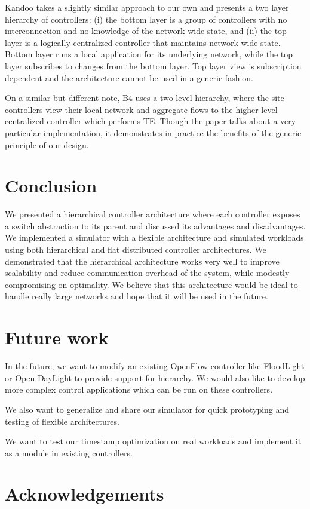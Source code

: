 \documentclass[10pt, twocolumn]{article}
\begin{document}
Kandoo\cite{kandoo} takes a slightly similar approach to our own and presents a two layer hierarchy of controllers: (i) the bottom layer is a group of controllers with no interconnection and no knowledge of the network-wide state, and (ii) the top layer is a logically centralized controller that maintains network-wide state. Bottom layer runs a local application for its underlying network, while the top layer subscribes to changes from the bottom layer. Top layer view is subscription dependent and the architecture cannot be used in a generic fashion.

On a similar but different note, B4\cite{b4} uses a two level hierarchy, where the site controllers view their local network and aggregate flows to the higher level centralized controller which performs TE. Though the paper talks about a very particular implementation, it demonstrates in practice the benefits of the generic principle of our design.

\section{Conclusion}
\label{sec:conc}
We presented a hierarchical controller architecture where each controller exposes a switch abstraction to its parent and discussed its advantages and disadvantages. We implemented a simulator with a flexible architecture and simulated workloads using both hierarchical and flat distributed controller architectures. We demonstrated that the hierarchical architecture works very well to improve scalability and reduce communication overhead of the system, while modestly compromising on optimality. We believe that this architecture would be ideal to handle really large networks and hope that it will be used in the future.

\section{Future work}
\label{sec:future}
In the future, we want to modify an existing OpenFlow controller like FloodLight or Open DayLight to provide support for hierarchy. We would also like to develop more complex control applications which can be run on these controllers.

We also want to generalize and share our simulator for quick prototyping and testing of flexible architectures.

We want to test our timestamp optimization on real workloads and implement it as a module in existing controllers.

\section{Acknowledgements}
\label{sec:ack}
\nocite{*}



\end{document}
